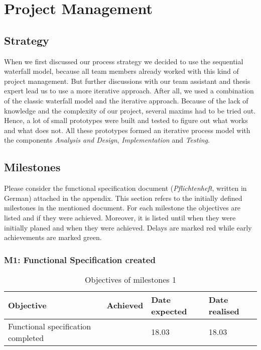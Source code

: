 \chapter{Project Management}

\section{Strategy}
When we first discussed our process strategy we decided to use the sequential waterfall model, because all team members already worked with this kind of project management. But further discussions with our team assistant and thesis expert lead us to use a more iterative approach. After all, we used a combination of the classic waterfall model and the iterative approach.
Because of the lack of knowledge and the complexity of our project, several maxims had to be tried out. Hence, a lot of small prototypes were built and tested to figure out what works and what does not. All these prototypes formed an iterative process model with the components \emph{Analysis and Design}, \emph{Implementation} and \emph{Testing}. 

\section{Milestones}
Please consider the functional specification document (\emph{Pflichtenheft}, written in German) attached in the appendix. This section refers to the initially defined milestones in the mentioned document. 
For each milestone the objectives are listed and if they were achieved. Moreover, it is listed until when they were initially planed and when they were achieved. Delays are marked red while early achievements are marked green. 

\subsection{M1: Functional Specification created}

\begin{table}[H]
	\centering
	\begin{tabular}{|p{}|p{}|p{}|p{}|}
		\hline 
		\bfseries Objective & \bfseries Achieved & \bfseries Date expected  & \bfseries Date realised \\ 
		\hline
		\hline 
		Functional specification completed  	& \tick & 18.03	&	18.03	 \\
		\hline 
	\end{tabular}
	\caption{Objectives of milestones 1}
\end{table}

